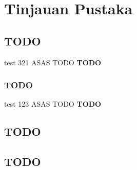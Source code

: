    \newpage

    {\centering
        \renewcommand{\thesection}{\arabic{section}.}
        \section{Tinjauan Pustaka}
    }

    \subsection{TODO}
    test 321 ASAS TODO \textbf{TODO}

    \subsubsection{TODO}
    test 123 ASAS TODO \textbf{TODO}

    \subsection{TODO}
    \subsection{TODO}

